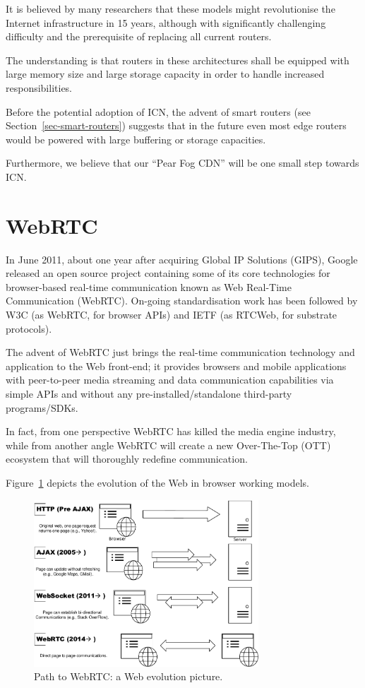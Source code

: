 	It is believed by many researchers that these models might revolutionise the Internet infrastructure in 15 years, although with significantly challenging difficulty and the prerequisite of replacing all current routers. 
	
	The understanding is that routers in these architectures shall be equipped with large memory size and large storage capacity in order to handle increased responsibilities. 
	
	Before the potential adoption of ICN, the advent of smart routers (see Section~\ref{sec-smart-routers}) suggests that in the future even most edge routers would be powered with large buffering or storage capacities. 
	
    Furthermore, we believe that our ``Pear Fog CDN'' will be one small step towards ICN. 

\section{WebRTC} %
In June 2011, about one year after acquiring Global IP Solutions (GIPS), Google released an open source project containing some of its core technologies for browser-based real-time communication known as Web Real-Time Communication (WebRTC). On-going standardisation work has been followed by W3C (as WebRTC, for browser APIs) and IETF (as RTCWeb, for substrate protocols). 

The advent of WebRTC just brings the real-time communication technology and application to the Web front-end; it provides browsers and mobile applications with peer-to-peer media streaming and data communication capabilities via simple APIs and without any pre-installed/standalone third-party programs/SDKs. 

In fact, from one perspective WebRTC has killed the media engine industry, while from another angle WebRTC will create a new Over-The-Top (OTT) ecosystem that will thoroughly redefine communication. 

Figure~\ref{fig:web-evolution} depicts the evolution of the Web in browser working models. 
\begin{figure}[ht]
	\centering
	\includegraphics[width=0.75\textwidth]{fig/webrtc/web_evolution.pdf}
	\caption{Path to WebRTC: a Web evolution picture.}\label{fig:web-evolution}
\end{figure}

